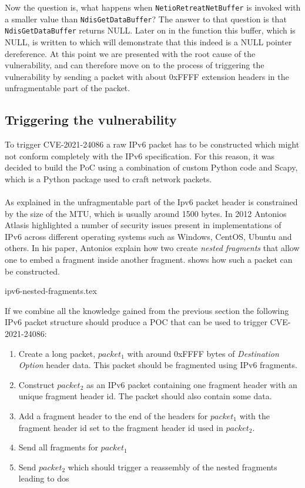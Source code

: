 \documentclass{report}
\begin{document}
Now the question is, what happens when \texttt{NetioRetreatNetBuffer} is invoked with a smaller value than \texttt{NdisGetDataBuffer}? The answer to that question is that \texttt{NdisGetDataBuffer} returns NULL. Later on in the function this buffer, which is NULL, is written to which will demonstrate that this indeed is a NULL pointer dereference. At this point we are presented with the root cause of the vulnerability, and can therefore move on to the process of triggering the vulnerability by sending a packet with about 0xFFFF extension headers in the unfragmentable part of the packet.

\subsection{Triggering the vulnerability}
\label{cve-2021-24086:triggering}
To trigger CVE-2021-24086 a raw IPv6 packet has to be constructed which might not conform completely with the IPv6 specification. For this reason, it was decided to build the PoC using a combination of custom Python code and Scapy\cite{url:ipv6:scapy}, which is a Python package used to craft network packets.
\\
\\
As explained in  the unfragmentable part of the Ipv6 packet header is constrained by the size of the MTU, which is usually around 1500 bytes. In 2012 Antonios Atlasis highlighted a number of security issues present in implementations of IPv6 across different operating systems such as Windows, CentOS, Ubuntu and others\cite{url:ipv6:abusing-ipv6}. In his paper, Antonios explain how two create \emph{nested fragments} that allow one to embed a fragment inside another fragment.  shows how such a packet can be constructed.

{ipv6-nested-fragments.tex}

If we combine all the knowledge gained from the previous section the following IPv6 packet structure should produce a \gls{POC} that can be used to trigger CVE-2021-24086:

\begin{enumerate}
    \item Create a long packet, $packet_1$ with around 0xFFFF bytes of \emph{Destination Option} header data. This packet should be fragmented using IPv6 fragments.
    \item Construct $packet_2$ as an IPv6 packet containing one fragment header with an unique fragment header id. The packet should also contain some data.
    \item Add a fragment header to the end of the headers for $packet_1$ with the fragment header id set to the fragment header id used in $packet_2$.
    \item Send all fragments for $packet_1$
    \item Send $packet_2$ which should trigger a reassembly of the nested fragments leading to \gls{dos}
\end{enumerate}
\end{document}
